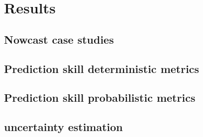 \chapter{Results}
\label{chapter:results}

\section{Nowcast case studies}

\section{Prediction skill deterministic metrics}

\section{Prediction skill probabilistic metrics}

\section{uncertainty estimation}


 
